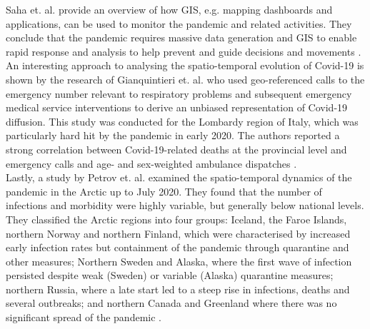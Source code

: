 Saha et. al. provide an overview of how GIS, e.g. mapping dashboards and applications, can be used to monitor the pandemic and related activities. They conclude that the pandemic requires massive data generation and GIS to enable rapid response and analysis to help prevent and guide decisions and movements \autocite[][]{saha2020monitoring}. \\
An interesting approach to analysing the spatio-temporal evolution of Covid-19 is shown by the research of Gianquintieri et. al. who used geo-referenced calls to the emergency number relevant to respiratory problems and subsequent emergency medical service interventions to derive an unbiased representation of Covid-19 diffusion. This study was conducted for the Lombardy region of Italy, which was particularly hard hit by the pandemic in early 2020. The authors reported a strong correlation between Covid-19-related deaths at the provincial level and emergency calls and age- and sex-weighted ambulance dispatches \autocite[][]{gianquintieri2020mapping}. \\
Lastly, a study by Petrov et. al. examined the spatio-temporal dynamics of the pandemic in the Arctic up to July 2020. They found that the number of infections and morbidity were highly variable, but generally below national levels. They classified the Arctic regions into four groups: Iceland, the Faroe Islands, northern Norway and northern Finland, which were characterised by increased early infection rates but containment of the pandemic through quarantine and other measures; Northern Sweden and Alaska, where the first wave of infection persisted despite weak (Sweden) or variable (Alaska) quarantine measures; northern Russia, where a late start led to a steep rise in infections, deaths and several outbreaks; and northern Canada and Greenland where there was no significant spread of the pandemic \autocite[][]{petrov2020spatiotemporal}.
